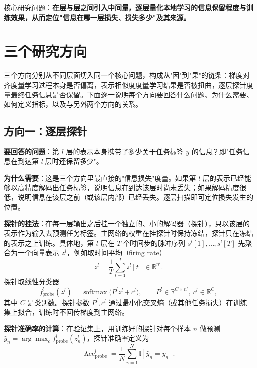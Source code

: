 \documentclass[journal,12pt,onecolumn]{IEEEtran}
\begin{document}
核心研究问题：\textbf{在层与层之间引入中间量，逐层量化本地学习的信息保留程度与训练效果，从而定位"信息在哪一层损失、损失多少"及其来源。}

\section{三个研究方向}

三个方向分别从不同层面切入同一个核心问题，构成从"因"到"果"的链条：梯度对齐度量学习过程本身是否偏离，表示相似度度量学习结果是否被扭曲，逐层探针度量最终任务信息是否保留。下面逐一说明每个方向要回答什么问题、为什么需要、如何定义指标，以及与另外两个方向的关系。

\subsection{方向一：逐层探针}

\textbf{要回答的问题}：第 $l$ 层的表示本身携带了多少关于任务标签 $y$ 的信息？即"任务信息在到达第 $l$ 层时还保留多少"。

\textbf{为什么需要}：这是三个方向里最直接的"信息损失"度量。如果第 $l$ 层的表示已经能够以高精度解码出任务标签，说明信息在到达该层时尚未丢失；如果解码精度很低，说明信息在该层之前（或该层内部）已经丢失。逐层扫描即可定位损失发生的位置。

\textbf{探针的挂法}：在每一层输出之后挂一个独立的、小的解码器（探针），只以该层的表示作为输入去预测任务标签。主网络的权重在挂探针时保持冻结，探针只在冻结的表示之上训练。具体地，第 $l$ 层在 $T$ 个时间步的脉冲序列 $s^l[1],\dots,s^l[T]$ 先聚合为一个向量表示 $z^l$，例如取时间平均（firing rate）
\begin{equation}
z^l = \frac{1}{T}\sum_{t=1}^{T} s^l[t]\in\mathbb R^{n^l}.
\end{equation}
探针取线性分类器
\begin{equation}
f^l_{\mathrm{probe}}(z^l) = \operatorname{softmax}\big(P^l z^l + c^l\big),
\qquad
P^l\in\mathbb R^{C\times n^l},\ c^l\in\mathbb R^C,
\end{equation}
其中 $C$ 是类别数。探针参数 $P^l, c^l$ 通过最小化交叉熵（或其他任务损失）在训练集上拟合，训练时不回传梯度到主网络。

\textbf{探针准确率的计算}：在验证集上，用训练好的探针对每个样本 $n$ 做预测 $\hat y_n = \arg\max_c f^l_{\mathrm{probe}}(z^l_n)$，探针准确率定义为
\begin{equation}
\operatorname{Acc}^l_{\mathrm{probe}} = \frac{1}{N}\sum_{n=1}^{N}\mathbb I[\hat y_n = y_n].
\end{equation}
\end{document}
